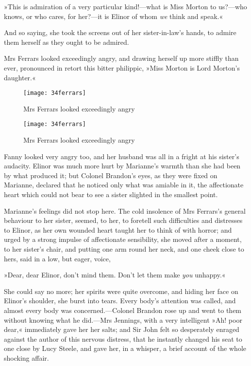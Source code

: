 »This is admiration of a very particular kind!—what is Miss Morton to us?—who knows, or who cares, for her?—it is Elinor of whom \textit{we} think and speak.«

And so saying, she took the screens out of her sister-in-law’s hands, to admire them herself as they ought to be admired.

Mrs Ferrars looked exceedingly angry, and drawing herself up more stiffly than ever, pronounced in retort this bitter philippic, »Miss Morton is Lord Morton’s daughter.«



\makeatletter
{}
{%
	\begin{figure}[tbph]
	\centering
	\texttt{[image: 34ferrars]}
	\caption{Mrs Ferrars looked exceedingly angry}
	\end{figure}
}{%
	\begin{figure}[tbph]
	\centering
	\texttt{[image: 34ferrars]}
	\caption{Mrs Ferrars looked exceedingly angry}
	\end{figure}
}
\makeatother

Fanny looked very angry too, and her husband was all in a fright at his sister’s audacity. Elinor was much more hurt by Marianne’s warmth than she had been by what produced it; but Colonel Brandon’s eyes, as they were fixed on Marianne, declared that he noticed only what was amiable in it, the affectionate heart which could not bear to see a sister slighted in the smallest point.

Marianne’s feelings did not stop here. The cold insolence of Mrs Ferrars’s general behaviour to her sister, seemed, to her, to foretell such difficulties and distresses to Elinor, as her own wounded heart taught her to think of with horror; and urged by a strong impulse of affectionate sensibility, she moved after a moment, to her sister’s chair, and putting one arm round her neck, and one cheek close to hers, said in a low, but eager, voice,

»Dear, dear Elinor, don’t mind them. Don’t let them make \textit{you} unhappy.«

She could say no more; her spirits were quite overcome, and hiding her face on Elinor’s shoulder, she burst into tears. Every body’s attention was called, and almost every body was concerned.—Colonel Brandon rose up and went to them without knowing what he did.—Mrs Jennings, with a very intelligent »Ah! poor dear,« immediately gave her her salts; and Sir John felt so desperately enraged against the author of this nervous distress, that he instantly changed his seat to one close by Lucy Steele, and gave her, in a whisper, a brief account of the whole shocking affair.

